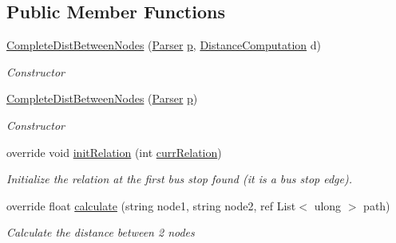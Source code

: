 \subsection*{Public Member Functions}
\begin{DoxyCompactItemize}
\item 
\hyperlink{classCompleteDistBetweenNodes_a7a1eeaedd4ae2ba2fae2405e05b14ffd}{Complete\+Dist\+Between\+Nodes} (\hyperlink{classParser}{Parser} \hyperlink{classDistBetweenNodes_a2a87914cc1b9e98fa17635950df55bd9}{p}, \hyperlink{classDistanceComputation}{Distance\+Computation} d)
\begin{DoxyCompactList}\small\item\em Constructor \end{DoxyCompactList}\item 
\hyperlink{classCompleteDistBetweenNodes_a522b59987a5947f2e623761df4e1bcf5}{Complete\+Dist\+Between\+Nodes} (\hyperlink{classParser}{Parser} \hyperlink{classDistBetweenNodes_a2a87914cc1b9e98fa17635950df55bd9}{p})
\begin{DoxyCompactList}\small\item\em Constructor \end{DoxyCompactList}\item 
override void \hyperlink{classCompleteDistBetweenNodes_a31b5ab0e3d811be03f4c7f54ec0d16a4}{init\+Relation} (int \hyperlink{classCompleteDistBetweenNodes_a59b1019044d1b1356aed96518d966b67}{curr\+Relation})
\begin{DoxyCompactList}\small\item\em Initialize the relation at the first bus stop found (it is a bus stop edge). \end{DoxyCompactList}\item 
override float \hyperlink{classCompleteDistBetweenNodes_a52ae39f7c4157f7212c2bc195664f259}{calculate} (string node1, string node2, ref List$<$ ulong $>$ path)
\begin{DoxyCompactList}\small\item\em Calculate the distance between 2 nodes \end{DoxyCompactList}\end{DoxyCompactItemize}
